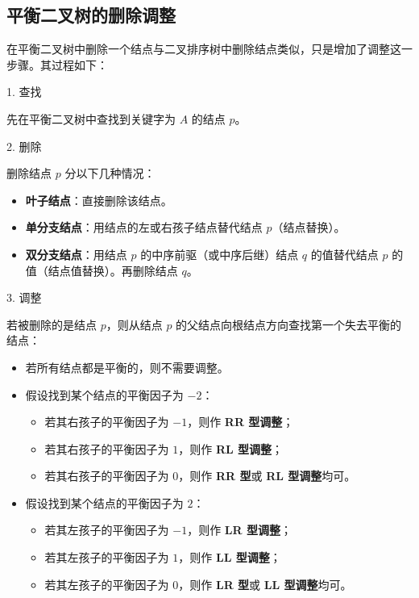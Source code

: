 \documentclass[lang=cn,newtx,10pt,scheme=chinese]{elegantbook}
\begin{document}
\subsection{平衡二叉树的删除调整}

在平衡二叉树中删除一个结点与二叉排序树中删除结点类似，只是增加了调整这一步骤。其过程如下：

1. 查找  

   先在平衡二叉树中查找到关键字为 $A$ 的结点 $p$。

2. 删除  

   删除结点 $p$ 分以下几种情况：
   \begin{itemize}
     \item \textbf{叶子结点}：直接删除该结点。
     \item \textbf{单分支结点}：用结点的左或右孩子结点替代结点 $p$（结点替换）。
     \item \textbf{双分支结点}：用结点 $p$ 的中序前驱（或中序后继）结点 $q$ 的值替代结点 $p$ 的值（结点值替换）。再删除结点 $q$。
   \end{itemize}

3. 调整  

   若被删除的是结点 $p$，则从结点 $p$ 的父结点向根结点方向查找第一个失去平衡的结点：
   \begin{itemize}
     \item 若所有结点都是平衡的，则不需要调整。
     \item 假设找到某个结点的平衡因子为 $-2$：
       \begin{itemize}
         \item 若其右孩子的平衡因子为 $-1$，则作 \textbf{RR 型调整}；
         \item 若其右孩子的平衡因子为 $1$，则作 \textbf{RL 型调整}；
         \item 若其右孩子的平衡因子为 $0$，则作 \textbf{RR 型}或 \textbf{RL 型调整}均可。
       \end{itemize}
     \item 假设找到某个结点的平衡因子为 $2$：
       \begin{itemize}
         \item 若其左孩子的平衡因子为 $-1$，则作 \textbf{LR 型调整}；
         \item 若其左孩子的平衡因子为 $1$，则作 \textbf{LL 型调整}；
         \item 若其左孩子的平衡因子为 $0$，则作 \textbf{LR 型}或 \textbf{LL 型调整}均可。
       \end{itemize}
   \end{itemize}
\end{document}
